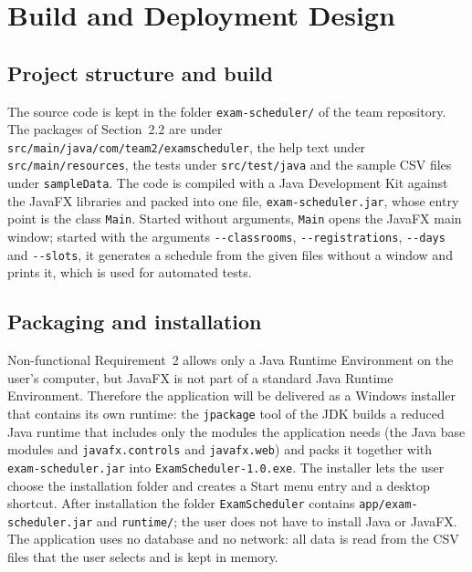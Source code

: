 \section{Build and Deployment Design}
\subsection{Project structure and build}
The source code is kept in the folder \texttt{exam-scheduler/} of the team repository. The packages of Section~2.2 are under \texttt{src/main/java/com/team2/examscheduler}, the help text under \texttt{src/main/resources}, the tests under \texttt{src/test/java} and the sample CSV files under \texttt{sampleData}. The code is compiled with a Java Development Kit against the JavaFX libraries and packed into one file, \texttt{exam-scheduler.jar}, whose entry point is the class \texttt{Main}. Started without arguments, \texttt{Main} opens the JavaFX main window; started with the arguments \texttt{-{}-classrooms}, \texttt{-{}-registrations}, \texttt{-{}-days} and \texttt{-{}-slots}, it generates a schedule from the given files without a window and prints it, which is used for automated tests.

\subsection{Packaging and installation}
Non-functional Requirement~2 allows only a Java Runtime Environment on the user's computer, but JavaFX is not part of a standard Java Runtime Environment. Therefore the application will be delivered as a Windows installer that contains its own runtime: the \texttt{jpackage} tool of the JDK builds a reduced Java runtime that includes only the modules the application needs (the Java base modules and \texttt{javafx.controls} and \texttt{javafx.web}) and packs it together with \texttt{exam-scheduler.jar} into \texttt{ExamScheduler-1.0.exe}. The installer lets the user choose the installation folder and creates a Start menu entry and a desktop shortcut. After installation the folder \texttt{ExamScheduler} contains \texttt{app/exam-scheduler.jar} and \texttt{runtime/}; the user does not have to install Java or JavaFX. The application uses no database and no network: all data is read from the CSV files that the user selects and is kept in memory.

